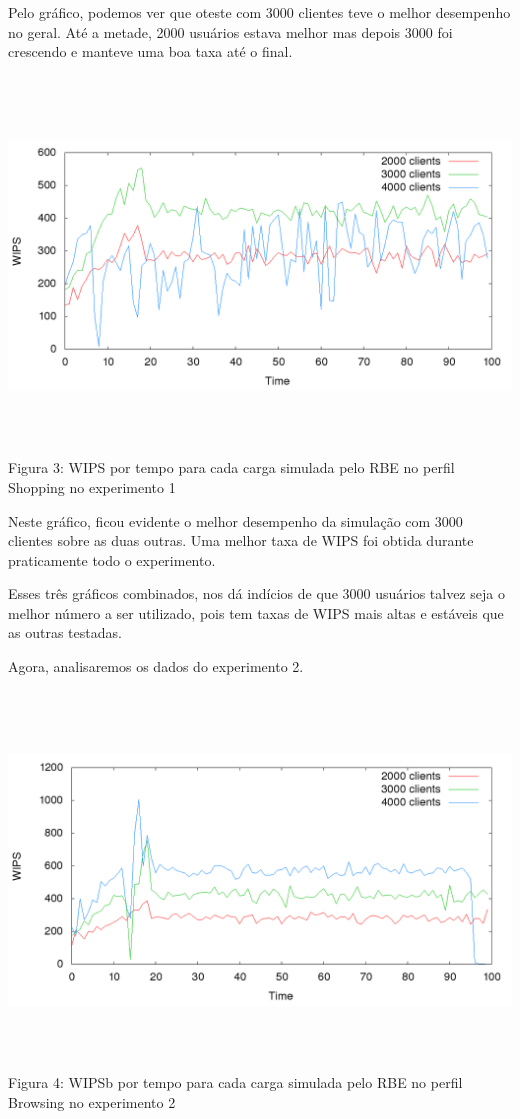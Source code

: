 \documentclass[11pt,twoside]{article}
\begin{document}
Pelo gráfico, podemos ver que oteste com 3000 clientes teve o melhor desempenho no geral. Até a metade, 2000 usuários estava melhor mas depois 3000 foi crescendo e manteve uma boa taxa até o final.
\begin{center}
\includegraphics[width=15cm, height=10cm]{images/exp1/plot_shopping}
Figura 3: WIPS por tempo para cada carga simulada pelo RBE no perfil Shopping no experimento 1
\end{center}

Neste gráfico, ficou evidente o melhor desempenho da simulação com 3000 clientes sobre as duas outras. Uma melhor taxa de WIPS foi obtida durante praticamente todo o experimento.

Esses três gráficos combinados, nos dá indícios de que 3000 usuários talvez seja o melhor número a ser utilizado, pois tem taxas de WIPS mais altas e estáveis que as outras testadas.

Agora, analisaremos os dados do experimento 2.

\begin{center}
\includegraphics[width=15cm, height=10cm]{images/exp2/plot_browsin}
Figura 4: WIPSb por tempo para cada carga simulada pelo RBE no perfil Browsing no experimento 2
\end{center}
\end{document}
